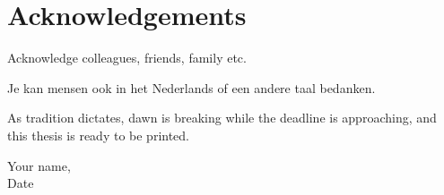 
\setcounter{footnote}{0}

\chapter{Acknowledgements}
Acknowledge colleagues, friends, family etc. %

Je kan mensen ook in het Nederlands of een andere taal bedanken.


As tradition dictates, dawn is breaking while the deadline is approaching, and this thesis is ready to be printed.

\vspace{10mm}

\raggedleft
Your name, \\
Date
